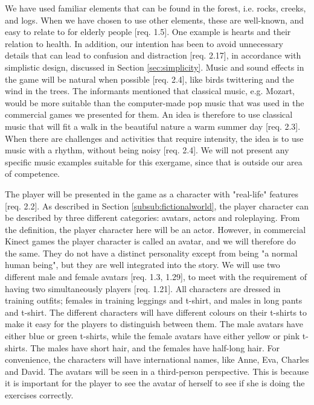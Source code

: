 We have used familiar elements that can be found in the forest, i.e. rocks, creeks, and logs. When we have chosen to use other elements, these are well-known, and easy to relate to for elderly people [req. 1.5]. One example is hearts and their relation to health. In addition, our intention has been to avoid unnecessary details that can lead to confusion and distraction [req. 2.17], in accordance with simplistic design, discussed in Section \ref{sec:simplicity}. Music and sound effects in the game will be natural when possible [req. 2.4], like birds twittering and the wind in the trees. The informants mentioned that classical music, e.g. Mozart, would be more suitable than the computer-made pop music that was used in the commercial games we presented for them. An idea is therefore to use classical music that will fit a walk in the beautiful nature a warm summer day [req. 2.3]. When there are challenges and activities that require intensity, the idea is to use music with a rhythm, without being noisy [req. 2.4]. We will not present any specific music examples suitable for this exergame, since that is outside our area of competence. 

The player will be presented in the game as a character with "real-life" features [req. 2.2]. As described in Section \ref{subsub:fictionalworld}, the player character can be described by three different categories: avatars, actors and roleplaying. From the definition, the player character here will be an actor. However, in commercial Kinect games the player character is called an avatar, and we will therefore do the same. They do not have a distinct personality except from being "a normal human being", but they are well integrated into the story. We will use two different male and female avatars [req. 1.3, 1.29], to meet with the requirement of having two simultaneously players [req. 1.21]. All characters are dressed in training outfits; females in training leggings and t-shirt, and males in long pants and t-shirt. The different characters will have different colours on their t-shirts to make it easy for the players to distinguish between them. The male avatars have either blue or green t-shirts, while the female avatars have either yellow or pink t-shirts. The males have short hair, and the females have half-long hair. For convenience, the characters will have international names, like Anne, Eva, Charles and David. The avatars will be seen in a third-person perspective. This is because it is important for the player to see the avatar of herself to see if she is doing the exercises correctly. 

